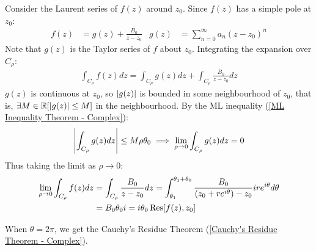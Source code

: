 \documentclass[12pt, english]{book}
\makeatletter
\renewenvironment{proof}[1][\proofname]{\par
	\pushQED{\qed}%
	\normalfont \topsep6\p@\@plus6\p@\relax
	\list{}{%
		\settowidth{\leftmargin}{\itshape\proofname:\hskip\labelsep}%
		\setlength{\labelwidth}{0pt}%
		\setlength{\itemindent}{-\leftmargin}%
	}%
	\item[\hskip\labelsep\itshape#1\@addpunct{:}]\ignorespaces
	}{ \popQED\endlist\@endpefalse}
\makeatother
\begin{document}
	\begin{proof}
		Consider the Laurent series of \(f(z)\) around \(z_0\). Since \(f(z)\) has a simple pole at \(z_0\):
		\begin{align*}
				f(z) &= g(z) +  \frac{B_0}{z-z_0} &
				g(z) &= \sum_{n=0}^{\infty} a_n(z-z_0)^n
		\end{align*}
		Note that \(g(z)\) is the Taylor series of \(f\) about \(z_0\). Integrating the expansion over \(C_\rho\):
		\begin{align*}
			\int_{C_\rho} f(z) dz 
			= \int_{C_\rho} g(z) dz + \int_{C_\rho} \frac{B_0}{z-z_0} dz
		\end{align*}
		\(g(z)\) is continuous at \(z_0\), so \(\abs{g(z)}\) is bounded in some neighbourhood of \(z_0\), that is, \(\exists M \in \mathbb{R}[\abs{g(z)} \leq M]\) in the neighbourhood. By the ML inequality (\cref{ML Inequality Theorem - Complex}):
		\begin{align*}
			\abs{\int_{C_\rho} g(z) dz} \leq M \rho \theta_0
			\implies \lim_{\rho \rightarrow 0} \int_{C_\rho} g(z) dz = 0 
		\end{align*}
		Thus taking the limit as \(\rho \rightarrow 0\):
		\begin{align*}
			\lim_{\rho \rightarrow 0}
			\int_{C_\rho} f(z) dz 
			&= \int_{C_\rho} \frac{B_0}{z-z_0} dz 
			= \int_{\theta_1}^{\theta_1 + \theta_0} \frac{B_0}{(z_0 + re^{i\theta}) - z_0} ire^{i\theta} d\theta  \\
			&= B_0 \theta_0 i
			= i\theta_0 \Res[f(z), z_0]
		\end{align*}
	\end{proof}
	\begin{observation}
		When \(\theta = 2\pi\), we get the Cauchy's Residue Theorem (\cref{Cauchy's Residue Theorem - Complex}).
	\end{observation}
\end{document}
